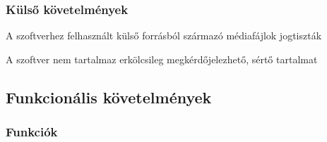 \subsubsection{Külső követelmények}

\begin{compactitem}
    \item A szoftverhez felhasznált külső forrásból származó médiafájlok jogtiszták
    \item A szoftver nem tartalmaz erkölcsileg megkérdőjelezhető, sértő tartalmat
\end{compactitem}

\subsection{Funkcionális követelmények}

\subsubsection{Funkciók}

